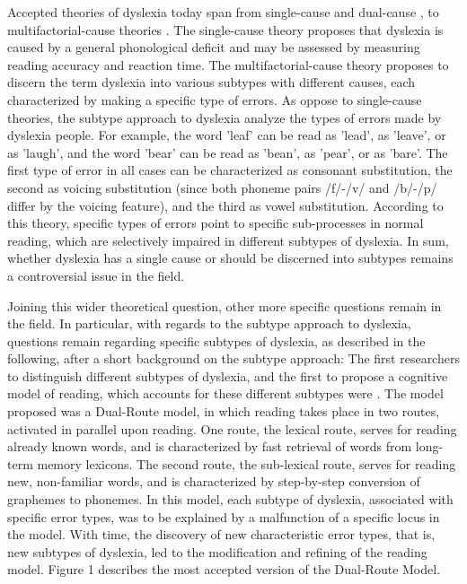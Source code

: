 Accepted theories of dyslexia today span from single-cause \citep{stanovich1988explaining, s98, s00} and dual-cause \citep{wolf1999double}, to multifactorial-cause theories \citep{ck12}. The single-cause theory proposes that dyslexia is caused by a general phonological deficit and may be assessed by measuring reading accuracy and reaction time. The multifactorial-cause theory proposes to discern the term dyslexia into various subtypes with different causes, each characterized by making a specific type of errors. As oppose to single-cause theories, the subtype approach to dyslexia analyze the types of errors made by dyslexia people. For example, the word 'leaf' can be read as 'lead', as 'leave', or as 'laugh', and the word 'bear' can be read as 'bean', as 'pear', or as 'bare'. The first type of error in all cases can be characterized as consonant substitution, the second as voicing substitution (since both phoneme pairs /f/-/v/ and /b/-/p/ differ by the voicing feature), and the third as vowel substitution. According to this theory, specific types of errors point to specific sub-processes in normal reading, which are selectively impaired in different subtypes of dyslexia. In sum, whether dyslexia has a single cause or should be discerned into subtypes remains a controversial issue in the field.

Joining this wider theoretical question, other more specific questions remain in the field. In particular, with regards to the subtype approach to dyslexia, questions remain regarding specific subtypes of dyslexia, as described in the following, after a short background on the subtype approach: The first researchers to distinguish different subtypes of dyslexia, and the first to propose a cognitive model of reading, which accounts for these different subtypes were \citet{mn73}. The model proposed was a Dual-Route model, in which reading takes place in two routes, activated in parallel upon reading. One route, the lexical route, serves for reading already known words, and is characterized by fast retrieval of words from long-term memory lexicons. The second route, the sub-lexical route, serves for reading new, non-familiar words, and is characterized by step-by-step conversion of graphemes to phonemes. In this model, each subtype of dyslexia, associated with specific error types, was to be explained by a malfunction of a specific locus in the model. With time, the discovery of new characteristic error types, that is, new subtypes of dyslexia, led to the modification and refining of the reading model. Figure 1 describes the most accepted version of the Dual-Route Model. 

